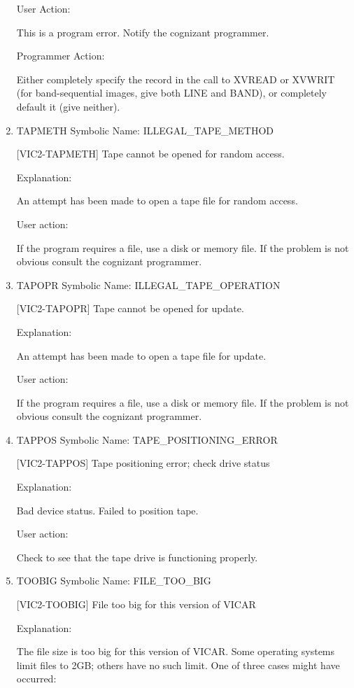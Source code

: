 \begin{enumerate}
User Action:

This is a program error.  Notify the cognizant programmer.

Programmer Action:

Either completely specify the record in the call to XVREAD or XVWRIT
(for band-sequential images, give both LINE and BAND), or completely
default it (give neither).


\item TAPMETH Symbolic Name: ILLEGAL\_TAPE\_METHOD

[VIC2-TAPMETH] Tape cannot be opened for random access.

Explanation:

An attempt has been made to open a tape file for random access.

User action:

If the program requires a file, use a disk or memory file.
If the problem is not obvious consult the cognizant programmer.


\item TAPOPR Symbolic Name: ILLEGAL\_TAPE\_OPERATION

[VIC2-TAPOPR] Tape cannot be opened for update.

Explanation:

An attempt has been made to open a tape file for update.

User action:

If the program requires a file, use a disk or memory file.
If the problem is not obvious consult the cognizant programmer.


\item TAPPOS Symbolic Name: TAPE\_POSITIONING\_ERROR

[VIC2-TAPPOS] Tape positioning error; check drive status

Explanation:

Bad device status. Failed to position tape.

User action:

Check to see that the tape drive is functioning properly.


\item TOOBIG Symbolic Name: FILE\_TOO\_BIG

[VIC2-TOOBIG] File too big for this version of VICAR

Explanation:

The file size is too big for this version of VICAR.  Some operating
systems limit files to 2GB; others have no such limit.  One of three
cases might have occurred:


\end{enumerate}
